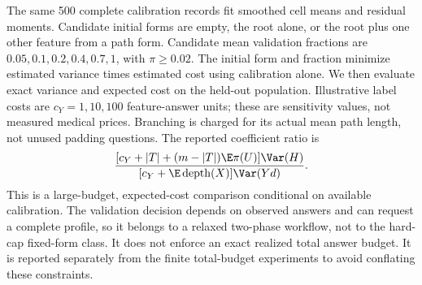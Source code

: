 The same 500 complete calibration records fit smoothed cell means and
residual moments. Candidate initial forms are empty, the root alone, or
the root plus one other feature from a path form. Candidate mean validation
fractions are $0.05,0.1,0.2,0.4,0.7,1$, with $\pi\ge0.02$.
The initial form and fraction minimize estimated variance times estimated
cost using calibration alone. We then evaluate exact variance and expected
cost on the held-out population. Illustrative label costs are
$c_Y=1,10,100$ feature-answer units; these are sensitivity values, not
measured medical prices. Branching is charged for its actual mean path
length, not unused padding questions. The reported coefficient ratio is
\[
 \frac{[c_Y+|T|+(m-|T|)\E\pi(U)]\Var(H)}
      {[c_Y+\E\operatorname{depth}(X)]\Var(Yd)}.
\]
This is a large-budget, expected-cost comparison conditional on available
calibration. The validation decision depends on observed answers and can
request a complete profile, so it belongs to a relaxed two-phase workflow,
not to the hard-cap fixed-form class. It does not enforce an exact realized
total answer budget. It is reported separately from the finite
total-budget experiments to avoid conflating these constraints.


